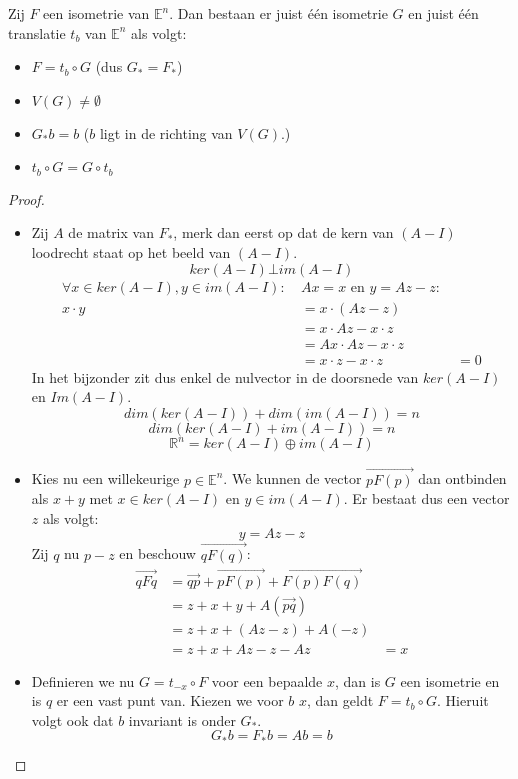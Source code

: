 \documentclass[main.tex]{subfiles}
\begin{document}
\begin{st}
  Zij $F$ een isometrie van $\mathbb{E}^{n}$.
  Dan bestaan er juist \'e\'en isometrie $G$ en juist \'e\'en translatie $t_{b}$ van $\mathbb{E}^{n}$ als volgt:
  \begin{itemize}
  \item $F = t_{b} \circ G$ (dus $G_{*} = F_{*}$)
  \item $V(G) \neq \emptyset$
  \item $G_{*}b = b$ ($b$ ligt in de richting van $V(G)$.)
  \item $t_{b}\circ G = G \circ t_{b}$
  \end{itemize}

  \begin{proof}
    \begin{itemize}
    \item 
    Zij $A$ de matrix van $F_{*}$, merk dan eerst op dat de kern van $(A-I)$ loodrecht staat op het beeld van $(A-I)$.
    \[ ker(A-I) \bot im(A-I) \]
    \[
    \begin{array}{rll}
      \forall x\in ker(A-I), y \in im(A-I):\ & Ax = x \text{ en } y = Az-z:\ &\\
      x\cdot y &= x \cdot (Az - z)\\
      &= x \cdot Az - x\cdot z\\
      &= Ax \cdot Az - x\cdot z\\
      &= x \cdot z - x \cdot z &= 0
    \end{array}
    \]
    In het bijzonder zit dus enkel de nulvector in de doorsnede van
    $ker(A-I)$ en $Im(A-I)$.
    \[ dim(ker(A-I)) + dim(im(A-I)) = n \]
    \[ dim(ker(A-I) + im(A-I)) = n \]
    \[ \mathbb{R}^{n} = ker(A-I) \oplus im(A-I)\]
  \item Kies nu een willekeurige $p\in \mathbb{E}^{n}$.
    We kunnen de vector $\overrightarrow{pF(p)}$ dan ontbinden als $x+y$ met $x\in ker(A-I)$ en $y\in im(A-I)$.
    Er bestaat dus een vector $z$ als volgt:
    \[ y = Az-z\]
    Zij $q$ nu $p-z$ en beschouw $\overrightarrow{qF(q)}$:
    \[
    \begin{array}{rll}
      \overrightarrow{qFq} &= \overrightarrow{qp} + \overrightarrow{pF(p)} + \overrightarrow{F(p)F(q)} &\\
                           &= z + x + y + A(\overrightarrow{pq}) &\\
                           &= z + x + (Az - z) + A(-z) &\\
                           &= z + x + Az - z -Az &= x
    \end{array}
    \]
  \item Definieren we nu $G = t_{-x} \circ F$ voor een bepaalde $x$, dan is $G$ een isometrie \waarom en is $q$ er een vast punt van.
    Kiezen we voor $b$ $x$, dan geldt $F=t_{b} \circ G$.
    Hieruit volgt ook dat $b$ invariant is onder $G_{*}$.
    \[ G_{*}b = F_{*}b = Ab = b \]


\end{itemize}
\end{proof}
\end{st}
\end{document}
